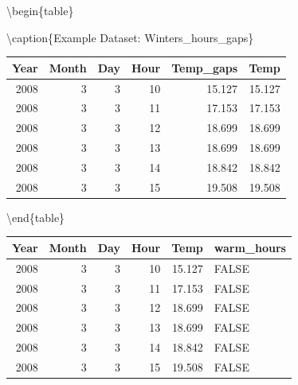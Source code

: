 \documentclass[
]{book}
\newenvironment{Shaded}{\begin{snugshade}}{\end{snugshade}}
\newcommand{\CommentTok}[1]{\textcolor[rgb]{0.56,0.35,0.01}{\textit{#1}}}
\newcommand{\DataTypeTok}[1]{\textcolor[rgb]{0.13,0.29,0.53}{#1}}
\newcommand{\DecValTok}[1]{\textcolor[rgb]{0.00,0.00,0.81}{#1}}
\newcommand{\KeywordTok}[1]{\textcolor[rgb]{0.13,0.29,0.53}{\textbf{#1}}}
\newcommand{\NormalTok}[1]{#1}
\newcommand{\OperatorTok}[1]{\textcolor[rgb]{0.81,0.36,0.00}{\textbf{#1}}}
\newcommand{\StringTok}[1]{\textcolor[rgb]{0.31,0.60,0.02}{#1}}
\begin{document}
\textbackslash begin\{table\}

\textbackslash caption\{\label{tab:unnamed-chunk-6}Example Dataset: Winters\_hours\_gaps\}
\fontsize{10}{12}\selectfont

\begin{tabular}[t]{r|r|r|r|r|r}
\hline
Year & Month & Day & Hour & Temp\_gaps & Temp\\
\hline
2008 & 3 & 3 & 10 & 15.127 & 15.127\\
\hline
2008 & 3 & 3 & 11 & 17.153 & 17.153\\
\hline
2008 & 3 & 3 & 12 & 18.699 & 18.699\\
\hline
2008 & 3 & 3 & 13 & 18.699 & 18.699\\
\hline
2008 & 3 & 3 & 14 & 18.842 & 18.842\\
\hline
2008 & 3 & 3 & 15 & 19.508 & 19.508\\
\hline
\end{tabular}

\textbackslash end\{table\}

\begin{Shaded}
\end{Shaded}

\begingroup\fontsize{10}{12}\selectfont

\begin{tabular}{r|r|r|r|r|l}
\hline
Year & Month & Day & Hour & Temp & warm\_hours\\
\hline
2008 & 3 & 3 & 10 & 15.127 & FALSE\\
\hline
2008 & 3 & 3 & 11 & 17.153 & FALSE\\
\hline
2008 & 3 & 3 & 12 & 18.699 & FALSE\\
\hline
2008 & 3 & 3 & 13 & 18.699 & FALSE\\
\hline
2008 & 3 & 3 & 14 & 18.842 & FALSE\\
\hline
2008 & 3 & 3 & 15 & 19.508 & FALSE\\
\hline
\end{tabular}
\endgroup{}
\end{document}
